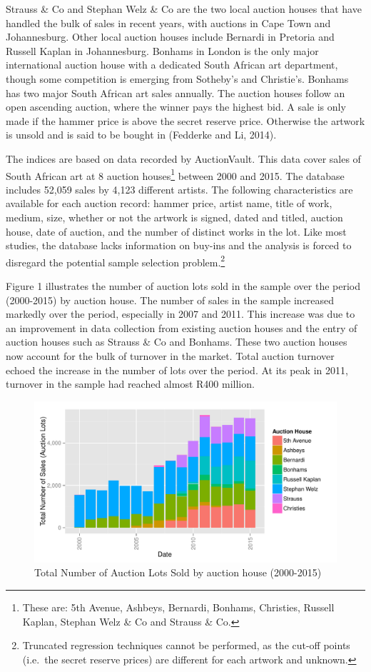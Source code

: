 \documentclass[12pt,]{article}
\let\rmarkdownfootnote\footnote%
\def\footnote{\protect\rmarkdownfootnote}
\begin{document}
Strauss \& Co and Stephan Welz \& Co are the two local auction houses
that have handled the bulk of sales in recent years, with auctions in
Cape Town and Johannesburg. Other local auction houses include Bernardi
in Pretoria and Russell Kaplan in Johannesburg. Bonhams in London is the
only major international auction house with a dedicated South African
art department, though some competition is emerging from Sotheby's and
Christie's. Bonhams has two major South African art sales annually. The
auction houses follow an open ascending auction, where the winner pays
the highest bid. A sale is only made if the hammer price is above the
secret reserve price. Otherwise the artwork is unsold and is said to be
bought in (Fedderke and Li, 2014).

The indices are based on data recorded by AuctionVault. This data cover
sales of South African art at 8 auction houses\footnote{These are: 5th
  Avenue, Ashbeys, Bernardi, Bonhams, Christies, Russell Kaplan, Stephan
  Welz \& Co and Strauss \& Co.} between 2000 and 2015. The database
includes 52,059 sales by 4,123 different artists. The following
characteristics are available for each auction record: hammer price,
artist name, title of work, medium, size, whether or not the artwork is
signed, dated and titled, auction house, date of auction, and the number
of distinct works in the lot. Like most studies, the database lacks
information on buy-ins and the analysis is forced to disregard the
potential sample selection problem.\footnote{Truncated regression
  techniques cannot be performed, as the cut-off points (i.e.~the secret
  reserve prices) are different for each artwork and unknown.}

Figure 1 illustrates the number of auction lots sold in the sample over
the period (2000-2015) by auction house. The number of sales in the
sample increased markedly over the period, especially in 2007 and 2011.
This increase was due to an improvement in data collection from existing
auction houses and the entry of auction houses such as Strauss \& Co and
Bonhams. These two auction houses now account for the bulk of turnover
in the market. Total auction turnover echoed the increase in the number
of lots over the period. At its peak in 2011, turnover in the sample had
reached almost R400 million.

\begin{figure}[htbp]
\centering
\includegraphics{Art_Price_Indices_3_files/figure-latex/figure1-1.pdf}
\caption{Total Number of Auction Lots Sold by auction house (2000-2015)}
\end{figure}
\end{document}
